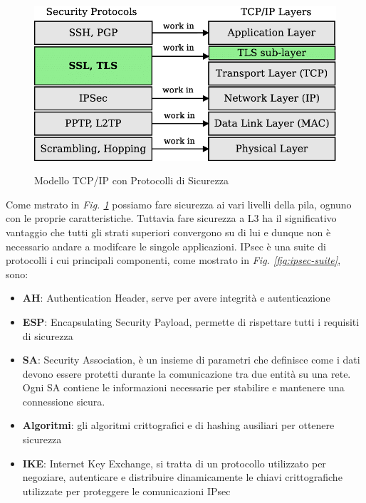 \begin{figure}[h!]
    \centering
    \includegraphics[scale=0.3]{Figures/security_tcp.png}
    \label{fig:tcpip}
    \caption{Modello TCP/IP con Protocolli di Sicurezza}
\end{figure}

Come mstrato in \textit{Fig. \ref{fig:tcpip}} possiamo fare sicurezza ai vari livelli della pila, ognuno con le proprie caratteristiche.
Tuttavia fare sicurezza a L3 ha il significativo vantaggio che tutti gli strati superiori convergono su di lui e dunque non è necessario andare a modifcare le singole applicazioni.
IPsec è una suite di protocolli i cui principali componenti, come mostrato in \textit{Fig. \ref{fig:ipsec-suite}}, sono: 

\begin{itemize}
    \item \textbf{AH}: Authentication Header, serve per avere integrità e autenticazione
    \item \textbf{ESP}: Encapsulating Security Payload, permette di rispettare tutti i requisiti di sicurezza
    \item \textbf{SA}: Security Association, è un insieme di parametri che definisce come i dati devono essere protetti durante la comunicazione tra due entità su una rete. Ogni SA contiene le informazioni necessarie per stabilire e mantenere una connessione sicura.
    \item \textbf{Algoritmi}: gli algoritmi crittografici e di hashing ausiliari per ottenere sicurezza
    \item \textbf{IKE}: Internet Key Exchange, si tratta di un protocollo utilizzato per negoziare, autenticare e distribuire dinamicamente le chiavi crittografiche utilizzate per proteggere le comunicazioni IPsec
\end{itemize}

